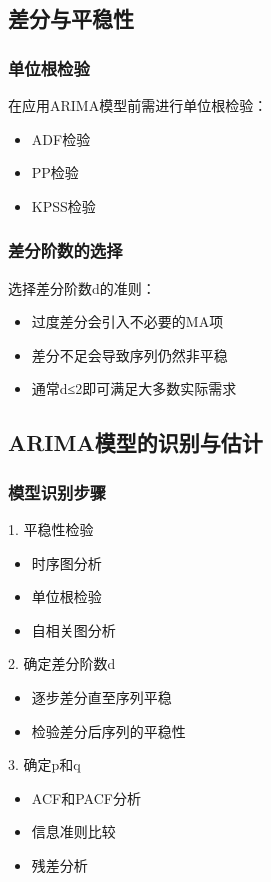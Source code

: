 \subsection{差分与平稳性}
\subsubsection{单位根检验}
在应用ARIMA模型前需进行单位根检验：
\begin{itemize}
    \item ADF检验
    \item PP检验
    \item KPSS检验
\end{itemize}

\subsubsection{差分阶数的选择}
选择差分阶数d的准则：
\begin{itemize}
    \item 过度差分会引入不必要的MA项
    \item 差分不足会导致序列仍然非平稳
    \item 通常d≤2即可满足大多数实际需求
\end{itemize}

\subsection{ARIMA模型的识别与估计}
\subsubsection{模型识别步骤}
1. 平稳性检验
   \begin{itemize}
       \item 时序图分析
       \item 单位根检验
       \item 自相关图分析
   \end{itemize}

2. 确定差分阶数d
   \begin{itemize}
       \item 逐步差分直至序列平稳
       \item 检验差分后序列的平稳性
   \end{itemize}

3. 确定p和q
   \begin{itemize}
       \item ACF和PACF分析
       \item 信息准则比较
       \item 残差分析
   \end{itemize}

